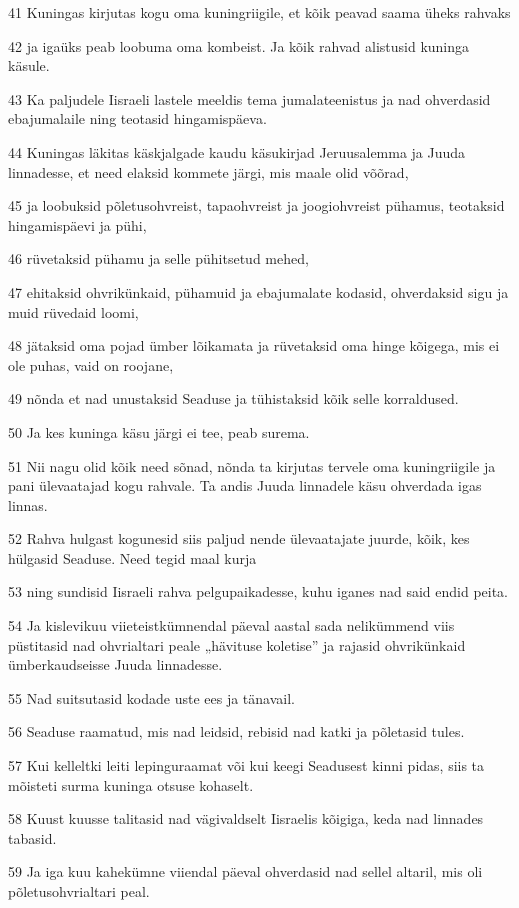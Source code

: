 \par 41 Kuningas kirjutas kogu oma kuningriigile, et kõik peavad saama üheks rahvaks
\par 42 ja igaüks peab loobuma oma kombeist. Ja kõik rahvad alistusid kuninga käsule.
\par 43 Ka paljudele Iisraeli lastele meeldis tema jumalateenistus ja nad ohverdasid ebajumalaile ning teotasid hingamispäeva.
\par 44 Kuningas läkitas käskjalgade kaudu käsukirjad Jeruusalemma ja Juuda linnadesse, et need elaksid kommete järgi, mis maale olid võõrad,
\par 45 ja loobuksid põletusohvreist, tapaohvreist ja joogiohvreist pühamus, teotaksid hingamispäevi ja pühi,
\par 46 rüvetaksid pühamu ja selle pühitsetud mehed,
\par 47 ehitaksid ohvrikünkaid, pühamuid ja ebajumalate kodasid, ohverdaksid sigu ja muid rüvedaid loomi,
\par 48 jätaksid oma pojad ümber lõikamata ja rüvetaksid oma hinge kõigega, mis ei ole puhas, vaid on roojane,
\par 49 nõnda et nad unustaksid Seaduse ja tühistaksid kõik selle korraldused.
\par 50 Ja kes kuninga käsu järgi ei tee, peab surema.
\par 51 Nii nagu olid kõik need sõnad, nõnda ta kirjutas tervele oma kuningriigile ja pani ülevaatajad kogu rahvale. Ta andis Juuda linnadele käsu ohverdada igas linnas.
\par 52 Rahva hulgast kogunesid siis paljud nende ülevaatajate juurde, kõik, kes hülgasid Seaduse. Need tegid maal kurja
\par 53 ning sundisid Iisraeli rahva pelgupaikadesse, kuhu iganes nad said endid peita.
\par 54 Ja kislevikuu viieteistkümnendal päeval aastal sada nelikümmend viis püstitasid nad ohvrialtari peale „hävituse koletise” ja rajasid ohvrikünkaid ümberkaudseisse Juuda linnadesse.
\par 55 Nad suitsutasid kodade uste ees ja tänavail.
\par 56 Seaduse raamatud, mis nad leidsid, rebisid nad katki ja põletasid tules.
\par 57 Kui kelleltki leiti lepinguraamat või kui keegi Seadusest kinni pidas, siis ta mõisteti surma kuninga otsuse kohaselt.
\par 58 Kuust kuusse talitasid nad vägivaldselt Iisraelis kõigiga, keda nad linnades tabasid.
\par 59 Ja iga kuu kahekümne viiendal päeval ohverdasid nad sellel altaril, mis oli põletusohvrialtari peal.
